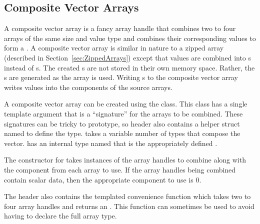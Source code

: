 \subsection{Composite Vector Arrays}
\label{sec:CompositeVectorArrays}


A composite vector array is a fancy array handle that combines two to four
arrays of the same size and value type and combines their corresponding
values to form a . A composite vector array is similar in nature
to a zipped array (described in Section~\ref{sec:ZippedArrays}) except that
values are combined into s instead of s. The created
s are not stored in their own memory space. Rather, the
s are generated as the array is used. Writing
s to the composite vector array writes values into the
components of the source arrays.

A composite vector array can be created using the
 class. This class has a single
template argument that is a ``signature'' for the arrays to be combined.
These signatures can be tricky to prototype, so
 header also contains a
helper struct named  to define the
type.  takes a variable
number of  types that compose the vector.
 has an internal type named
 that is the appropriately defined
.

The constructor for  takes
instances of the array handles to combine along with the component from
each array to use. If the array handles being combined contain scalar data,
then the appropriate component to use is 0.


The  header also
contains the templated convenience function
 which takes two to four array
handles and returns an . This
function can sometimes be used to avoid having to declare the full array
type.


